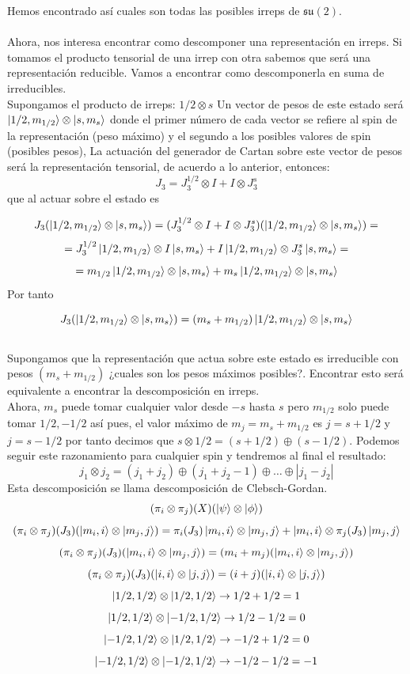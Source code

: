 \documentclass[12pt]{article}
\begin{document}
Hemos encontrado así cuales son todas las posibles irreps de $\mathfrak{s}\mathfrak{u}(2)$. \\\\
Ahora, nos interesa encontrar como descomponer una representación en irreps. Si tomamos el producto tensorial de una irrep con otra sabemos que será una representación reducible. Vamos a encontrar como descomponerla en suma de irreducibles. \\ Supongamos el producto de irreps:
$1/2\otimes s$ Un vector de pesos de este estado será $\ket{1/2, m_{1/2}}\otimes \ket{s,m_s}$ donde el primer número de cada vector se refiere al spin de la representación (peso máximo) y el segundo a los posibles valores de spin (posibles pesos), La actuación del generador de Cartan sobre este vector de pesos será la representación tensorial, de acuerdo a lo anterior, entonces:
$$J_3=J_3^{1/2}\otimes I+I\otimes J_3^s $$
que al actuar sobre el estado es 

$$J_3 (\ket{1/2, m_{1/2}}\otimes \ket{s,m_s}) =(J_3^{1/2}\otimes I+I\otimes J_3^s)(\ket{1/2, m_{1/2}}\otimes \ket{s,m_s})=$$
$$=J_3^{1/2} \ket{1/2, m_{1/2}} \otimes I  \ket{s,m_s}+I\ket{1/2, m_{1/2}}\otimes J_3^s\ket{s,m_s}=$$
$$=m_{1/2}\ket{1/2, m_{1/2}} \otimes  \ket{s,m_s}+m_s\ket{1/2, m_{1/2}}\otimes\ket{s, m_s}$$
Por tanto



$$J_3 (\ket{1/2, m_{1/2}}\otimes \ket{s,m_s}) =(m_s+m_{1/2}) \ket{1/2, m_{1/2}}\otimes \ket{s,m_s}$$ 
\\ 

Supongamos que la representación que actua sobre este estado es irreducible con pesos $(m_s+m_{1/2})$ ¿cuales son los pesos máximos posibles?. Encontrar esto será equivalente a encontrar la descomposición en irreps. \\ 
Ahora, $m_s$ puede tomar cualquier valor desde $-s$ hasta $s$ pero $m_{1/2}$ solo puede tomar $1/2, -1/2$ así pues, el valor máximo de $m_j=m_s+m_{1/2}$ es $j=s+1/2$ y $j=s-1/2$ por tanto decimos que 
$s\otimes 1/2 = (s+1/2)\oplus (s-1/2)$. Podemos seguir este razonamiento para cualquier spin y tendremos al final el resultado:
$$j_1\otimes j_2 = (j_1+j_2)\oplus (j_1+j_2-1)\oplus\dots\oplus|j_1-j_2|$$
Esta descomposición se llama descomposición de Clebsch-Gordan. 
$$(\pi_i \otimes \pi_j)(X)(\ket{\psi}\otimes\ket{\phi})$$
$$(\pi_i\otimes\pi_j)(J_3)(\ket{m_i, i}\otimes\ket{m_j,j})=\pi_i(J_3)\ket{m_i,i}\otimes \ket{m_j,j}+\ket{m_i, i}\otimes \pi_j(J_3)\ket{m_j,j}$$
$$(\pi_i\otimes\pi_j)(J_3)(\ket{m_i, i}\otimes\ket{m_j,j})=(m_i+m_j)(\ket{m_i,i}\otimes\ket{m_j,j})$$
$$(\pi_i\otimes\pi_j)(J_3)(\ket{i, i}\otimes\ket{j,j})=(i+j)(\ket{i,i}\otimes\ket{j,j})$$
$$\ket{1/2,1/2}\otimes\ket{1/2,1/2}\rightarrow1/2+1/2=1$$
$$\ket{1/2,1/2}\otimes\ket{-1/2,1/2}\rightarrow1/2-1/2=0$$
$$\ket{-1/2,1/2}\otimes\ket{1/2,1/2}\rightarrow-1/2+1/2=0$$
$$\ket{-1/2,1/2}\otimes\ket{-1/2,1/2}\rightarrow-1/2-1/2=-1$$
\end{document}
